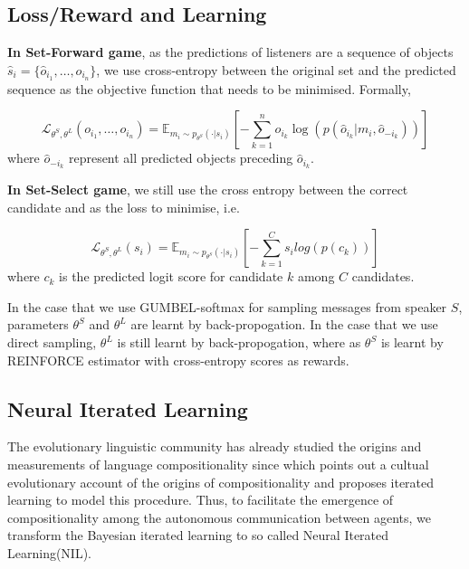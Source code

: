 \subsection{Loss/Reward and Learning}
\label{ssec3.2.3:loss_learning}

\textbf{In Set-Forward game}, as the predictions of listeners are a sequence of objects $\hat{s}_i=\{\hat{o}_{i_1}, \dots, \hat{o}_{i_n}\}$, we use cross-entropy between the original set and the predicted sequence as the objective function that needs to be minimised. Formally,

\begin{equation}
  \mathcal{L}_{\theta^S, \theta^L}(o_{i_1}, \dots, o_{i_n}) =\mathbb{E}_{m_i\sim p_{\theta^S}(\cdot|s_i)} \left[ -\sum_{k=1}^{n} o_{i_k} \log(p(\hat{o}_{i_k}|m_i, \hat{o}_{-i_k})) \right]
  \label{eq3.2.3.1:cross_entropy_seq}
\end{equation}
where $\hat{o}_{-i_k}$ represent all predicted objects preceding $\hat{o}_{i_k}$.

\noindent\textbf{In Set-Select game}, we still use the cross entropy between the correct candidate and  as the loss to minimise, i.e.

\begin{equation}
  \mathcal{L}_{\theta^S, \theta^L}(s_i) = \mathbb{E}_{m_i\sim p_{\theta^S}(\cdot|s_i)} \left[-\sum_{k=1}^{C} s_i log(p(c_k)) \right]
  \label{eq3.2.3.2:cross_entropy_choose}
\end{equation}
where $c_k$ is the predicted logit score for candidate $k$ among $C$ candidates.

In the case that we use GUMBEL-softmax for sampling messages from speaker $S$, parameters $\theta^S$ and $\theta^L$ are learnt by back-propogation. In the case that we use direct sampling, $\theta^L$ is still learnt by back-propogation, where as $\theta^S$ is learnt by REINFORCE estimator \cite{williams1992simple} with cross-entropy scores as rewards.

\subsection{Neural Iterated Learning}
\label{ssec3.2.4:iterated_learning}

The evolutionary linguistic community has already studied the origins and measurements of language compositionality since \cite{kirby2002emergence} which points out a cultual evolutionary account of the origins of compositionality and proposes iterated learning to model this procedure. Thus, to facilitate the emergence of compositionality among the autonomous communication between agents, we transform the Bayesian iterated learning to so called Neural Iterated Learning(NIL).

